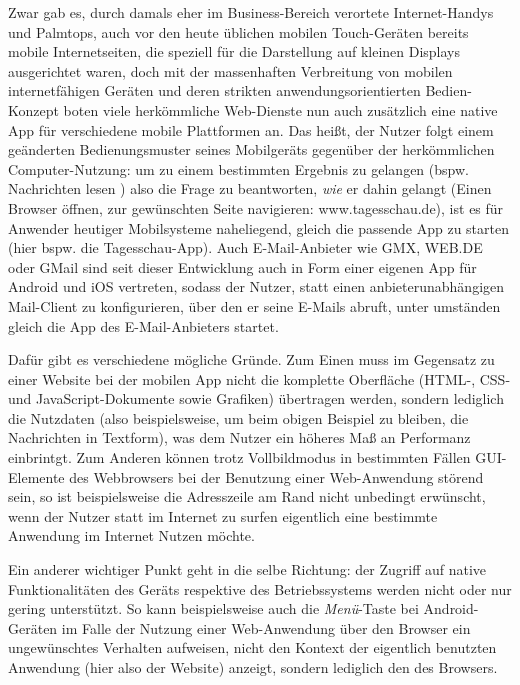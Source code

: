 Zwar gab es, durch damals eher im Business-Bereich verortete Internet-Handys und Palmtops, auch vor den heute üblichen mobilen Touch-Geräten bereits mobile Internetseiten, die speziell für die Darstellung auf kleinen Displays ausgerichtet waren, doch mit der massenhaften Verbreitung von mobilen internetfähigen Geräten und deren strikten anwendungsorientierten Bedien-Konzept boten viele herkömmliche Web-Dienste nun auch zusätzlich eine native App für verschiedene mobile Plattformen an. 
Das heißt, der Nutzer folgt einem geänderten Bedienungsmuster seines Mobilgeräts gegenüber der herkömmlichen Computer-Nutzung: um zu einem bestimmten Ergebnis zu gelangen (bspw. \glqq Nachrichten lesen \grqq) also die Frage zu beantworten, \emph{wie} er dahin gelangt (Einen Browser öffnen, zur gewünschten Seite navigieren: www.tagesschau.de), ist es für Anwender heutiger Mobilsysteme naheliegend, gleich die passende App zu starten (hier bspw. die Tagesschau-App).
Auch E-Mail-Anbieter wie GMX\cite{gmx}, WEB.DE\cite{web.de} oder GMail\cite{gmail} sind seit dieser Entwicklung auch in Form einer eigenen App für Android und iOS vertreten, sodass der Nutzer, statt einen anbieterunabhängigen Mail-Client zu konfigurieren, über den er seine E-Mails abruft, unter umständen gleich die App des E-Mail-Anbieters startet. 

Dafür gibt es verschiedene mögliche Gründe. Zum Einen muss im Gegensatz zu einer Website bei der mobilen App nicht die komplette Oberfläche (HTML-, CSS- und JavaScript-Dokumente sowie Grafiken) übertragen werden, sondern lediglich die Nutzdaten (also beispielsweise, um beim obigen Beispiel zu bleiben, die Nachrichten in Textform), was dem Nutzer ein höheres Maß an Performanz einbrintgt.
Zum Anderen können trotz Vollbildmodus in bestimmten Fällen GUI-Elemente des Webbrowsers bei der Benutzung einer Web-Anwendung störend sein, so ist beispielsweise die Adresszeile am Rand nicht unbedingt erwünscht, wenn der Nutzer statt im Internet zu surfen eigentlich eine bestimmte Anwendung im Internet Nutzen möchte. 

Ein anderer wichtiger Punkt geht in die selbe Richtung: der Zugriff auf native Funktionalitäten des Geräts respektive des Betriebssystems werden nicht oder nur gering unterstützt.
So kann beispielsweise auch die \emph{Menü}-Taste bei Android-Geräten im Falle der Nutzung einer Web-Anwendung über den Browser ein ungewünschtes Verhalten aufweisen,  nicht den Kontext der eigentlich benutzten Anwendung (hier also der Website) anzeigt, sondern lediglich den des Browsers.


